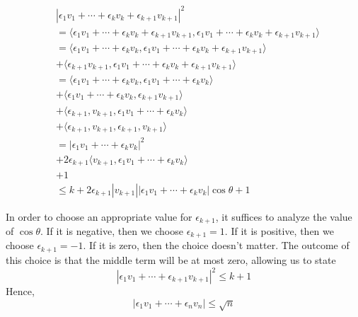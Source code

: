 \documentclass[letterpaper,11pt]{article}
\begin{document}
\begin{enumerate}
        \begin{align*}
            &
            |
            \epsilon_1 v_1 + \cdots + \epsilon_k v_k + \epsilon_{k+1} v_{k+1}
            |^2 \\
            &=
            \langle
            \epsilon_1 v_1 + \cdots + \epsilon_k v_k + \epsilon_{k+1} v_{k+1},
            \epsilon_1 v_1 + \cdots + \epsilon_k v_k + \epsilon_{k+1} v_{k+1}
            \rangle \\
            &=
            \langle
            \epsilon_1 v_1 + \cdots + \epsilon_k v_k,
            \epsilon_1 v_1 + \cdots + \epsilon_k v_k + \epsilon_{k+1} v_{k+1}
            \rangle \\
            &+
            \langle
            \epsilon_{k+1} v_{k+1},
            \epsilon_1 v_1 + \cdots + \epsilon_k v_k + \epsilon_{k+1} v_{k+1}
            \rangle \\
            &=
            \langle
            \epsilon_1 v_1 + \cdots + \epsilon_k v_k,
            \epsilon_1 v_1 + \cdots + \epsilon_k v_k
            \rangle \\
            &+
            \langle
            \epsilon_1 v_1 + \cdots + \epsilon_k v_k,
            \epsilon_{k+1} v_{k+1}
            \rangle \\
            &+
            \langle
            \epsilon_{k+1}, v_{k+1},
            \epsilon_1 v_1 + \cdots + \epsilon_k v_k
            \rangle \\
            &+
            \langle
            \epsilon_{k+1}, v_{k+1},
            \epsilon_{k+1}, v_{k+1}
            \rangle \\
            &=
            |\epsilon_1 v_1 + \cdots + \epsilon_k v_k|^2 \\
            &+
            2 \epsilon_{k+1}
            \langle
            v_{k+1}, \epsilon_1 v_1 + \cdots + \epsilon_k v_k
            \rangle \\
            &+
            1 \\
            &\leq
            k
            +
            2 \epsilon_{k+1}
            |v_{k+1}| |\epsilon_1 v_1 + \cdots + \epsilon_k v_k| \cos \theta
            +
            1
        \end{align*}

        In order to choose an appropriate value for $\epsilon_{k+1}$, it
        suffices to analyze the value of $\cos \theta$. If it is negative, then
        we choose $\epsilon_{k+1} = 1$. If it is positive, then we choose
        $\epsilon_{k+1} = -1$. If it is zero, then the choice doesn't matter.
        The outcome of this choice is that the middle term will be at most
        zero, allowing us to state
        $$
        |\epsilon_1 v_1 + \cdots + \epsilon_{k+1} v_{k+1}|^2 \leq k + 1
        $$
        Hence,
        $$
        |\epsilon_1 v_1 + \cdots + \epsilon_n v_n| \leq \sqrt{n}
        $$
\end{enumerate}
\end{document}
